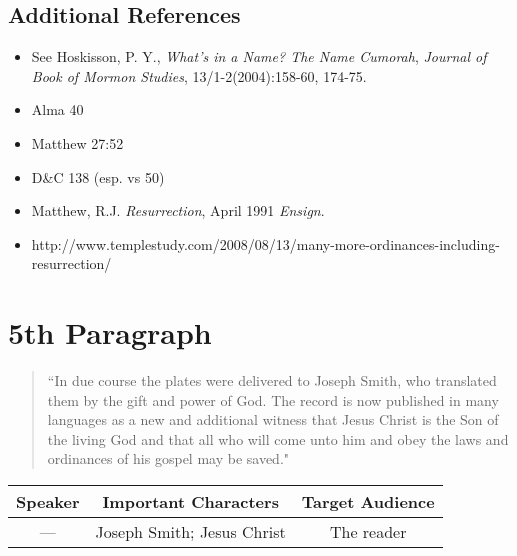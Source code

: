 \documentclass[12pt]{report}
\begin{document}
\subsection{Additional References\label{intro:references4}}
\begin{itemize}
\item See Hoskisson, P. Y., \emph{What's in a Name? The Name \emph{Cumorah}}, \emph{Journal of Book of Mormon Studies}, 13/1-2(2004):158-60, 174-75.
\item Alma 40
\item Matthew 27:52
\item D\&C 138 (esp. vs 50)
\item Matthew, R.J. \emph{Resurrection}, April 1991 \emph{Ensign}.
\item http://www.templestudy.com/2008/08/13/many-more-ordinances-including-resurrection/
\end{itemize}

\section{5th Paragraph\label{intro:5th}}
\begin{center}
\begin{quote}
``In due course the plates were delivered to Joseph Smith, who translated them by the gift and power of God.  The record is now published in many languages as a new and additional witness that Jesus Christ is the Son of the living God and that all who will come unto him and obey the laws and ordinances of his gospel may be saved."
\end{quote}
\end{center}

\begin{table}[h!]
\centering
\label{table:intro5}
\begin{tabular*}{\textwidth}{c @{\extracolsep{\fill}}cc}
Speaker & Important Characters & Target Audience \\
\hline
\rule{0pt}{3ex} --- & Joseph Smith; Jesus Christ & The reader 
\end{tabular*}
\end{table}
\end{document}
